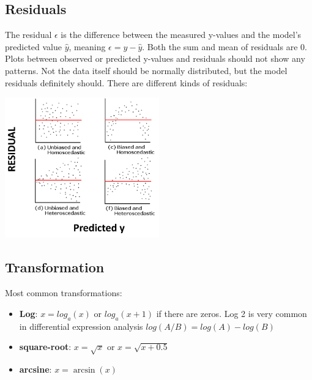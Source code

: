 \documentclass{article}
\begin{document}
\subsection{Residuals}
The residual $\epsilon$ is the difference between the measured y-values and the model's predicted value $\hat{y}$, meaning $\epsilon = y - \hat{y}$. Both the sum and mean of residuals are 0. Plots between observed or predicted y-values and residuals should not show any patterns. Not the data itself should be normally distributed, but the model residuals definitely should. There are different kinds of residuals:
\begin{center}
\includegraphics[width = 0.5\textwidth]{intro/residuals.png}
\end{center}

\subsection{Transformation}
Most common transformations:
\begin{itemize}
    \item \textbf{Log}: $x = log_a (x)$ or $log_a(x+1)$ if there are zeros. Log 2 is very common in differential expression analysis $log(A/B) = log(A)-log(B)$
    \item \textbf{square-root}: $x = \sqrt{x}$ or $x = \sqrt{x+0.5}$
    \item \textbf{arcsine}: $x = \arcsin (x)$
\end{itemize}
\end{document}
